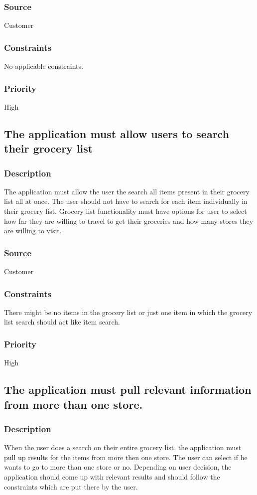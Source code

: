 \subsubsection{Source}
Customer
\subsubsection{Constraints}
No applicable constraints.
\subsubsection{Priority}
High\\
\subsection{The application must allow users to search their grocery list}
\subsubsection{Description}
The application must allow the user the search all items present in their grocery list all at once. The user should not have to search for each item individually in their grocery list. Grocery list functionality must have options for user to select how far they are willing to travel to get their groceries and how many stores they are willing to visit.
\subsubsection{Source}
Customer
\subsubsection{Constraints}
There might be no items in the grocery list or just one item in which the grocery list search should act like item search.
\subsubsection{Priority}
High\\

\subsection{The application must pull relevant information from more than one store.}
\subsubsection{Description}
When the user does a search on their entire grocery list, the application must pull up results for the items from more then one store. The user can select if he wants to go to more than one store or no. Depending on user decision, the application should come up with relevant results and should follow the constraints which are put there by the user. 
